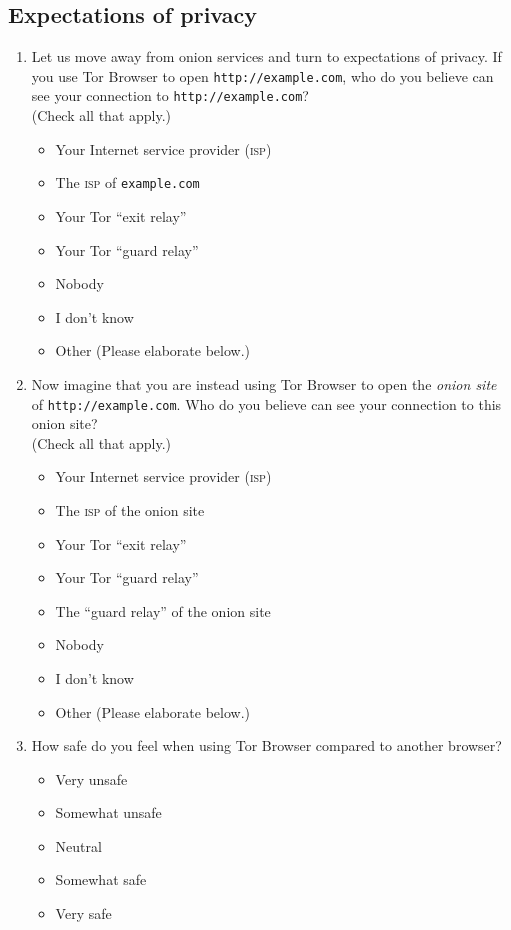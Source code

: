 \subsection{Expectations of privacy}
\begin{enumerate}
    \item Let us move away from onion services and turn to expectations of
        privacy. If you use Tor Browser to open \texttt{http://example.com}, who
        do you believe can see your connection to
        \texttt{http://example.com}?\\(Check all that apply.)
        \begin{itemize}[label=$\Square$]
            \item Your Internet service provider (\textsc{isp})
            \item The \textsc{isp} of \texttt{example.com}
            \item Your Tor ``exit relay''
            \item Your Tor ``guard relay''
            \item Nobody
            \item I don't know
            \item Other (Please elaborate below.)
        \end{itemize}

    \item Now imagine that you are instead using Tor Browser to open the
        \emph{onion site} of \texttt{http://example.com}. Who do you believe can
        see your connection to this onion site?\\(Check all that apply.)
        \begin{itemize}[label=$\Square$]
            \item Your Internet service provider (\textsc{isp})
            \item The \textsc{isp} of the onion site
            \item Your Tor ``exit relay''
            \item Your Tor ``guard relay''
            \item The ``guard relay'' of the onion site
            \item Nobody
            \item I don't know
            \item Other (Please elaborate below.)
        \end{itemize}

    \item How safe do you feel when using Tor Browser compared to another
        \label{q6_3}
        browser?
        \begin{itemize}[label=$\Circle$]
            \item Very unsafe
            \item Somewhat unsafe
            \item Neutral
            \item Somewhat safe
            \item Very safe
        \end{itemize}


\end{enumerate}
